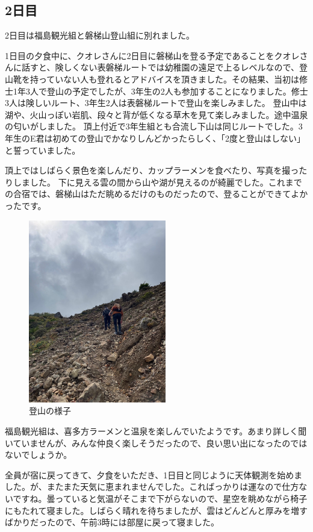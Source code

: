 \documentclass[../main]{subfiles}
\begin{document}
\subsection{2日目}
2日目は福島観光組と磐梯山登山組に別れました。

1日目の夕食中に、クオレさんに2日目に磐梯山を登る予定であることをクオレさんに話すと、険しくない表磐梯ルートでは幼稚園の遠足で上るレベルなので、登山靴を持っていない人も登れるとアドバイスを頂きました。その結果、当初は修士1年3人で登山の予定でしたが、3年生の2人も参加することになりました。修士3人は険しいルート、3年生2人は表磐梯ルートで登山を楽しみました。
登山中は湖や、火山っぽい岩肌、段々と背が低くなる草木を見て楽しみました。途中温泉の匂いがしました。
頂上付近で3年生組とも合流し下山は同じルートでした。3年生のE君は初めての登山でかなりしんどかったらしく、「2度と登山はしない」と誓っていました。

頂上ではしばらく景色を楽しんだり、カップラーメンを食べたり、写真を撮ったりしました。
下に見える雲の間から山や湖が見えるのが綺麗でした。これまでの合宿では、磐梯山はただ眺めるだけのものだったので、登ることができてよかったです。
\begin{figure}[H]
\centering
\includegraphics[width=6cm]{sections/Nakahara/IMG_8389.jpg}
\caption{登山の様子}
\centering
\end{figure}

福島観光組は、喜多方ラーメンと温泉を楽しんでいたようです。あまり詳しく聞いていませんが、みんな仲良く楽しそうだったので、良い思い出になったのではないでしょうか。

全員が宿に戻ってきて、夕食をいただき、1日目と同じように天体観測を始めました。が、またまた天気に恵まれませんでした。こればっかりは運なので仕方ないですね。曇っていると気温がそこまで下がらないので、星空を眺めながら椅子にもたれて寝ました。しばらく晴れを待ちましたが、雲はどんどんと厚みを増すばかりだったので、午前3時には部屋に戻って寝ました。
\end{document}
